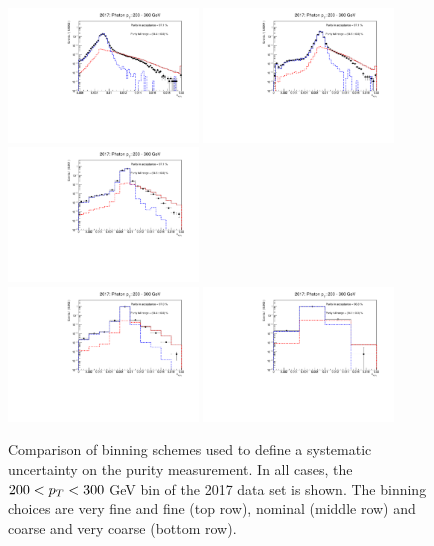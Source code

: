 \begin{figure}[htbp]
    \centering
        \includegraphics[width=0.45\textwidth]{PhotonPurity/fit_2017_pt200-300_vfine.pdf}
        \includegraphics[width=0.45\textwidth]{PhotonPurity/fit_2017_pt200-300_fine.pdf} \\
        \includegraphics[width=0.45\textwidth]{PhotonPurity/fit_2017_pt200-300_nominal.pdf} \\
        \includegraphics[width=0.45\textwidth]{PhotonPurity/fit_2017_pt200-300_coarse.pdf}
        \includegraphics[width=0.45\textwidth]{PhotonPurity/fit_2017_pt200-300_vcoarse.pdf}
    \caption{Comparison of binning schemes used to define a systematic uncertainty on the purity measurement. In all cases, the 
    $200<p_T<300$ GeV bin of the 2017 data set is shown. The binning choices are very fine and fine (top row), nominal (middle row) 
    and coarse and very coarse (bottom row).}
    \label{fig:purity_binning}
\end{figure}

\clearpage